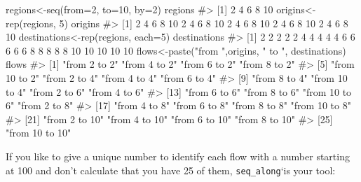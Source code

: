 \documentclass[
  letterpaper,
  DIV=11,
  numbers=noendperiod]{scrreprt}
\newenvironment{Shaded}{\begin{snugshade}}{\end{snugshade}}
\newcommand{\AttributeTok}[1]{\textcolor[rgb]{0.40,0.45,0.13}{#1}}
\newcommand{\CommentTok}[1]{\textcolor[rgb]{0.37,0.37,0.37}{#1}}
\newcommand{\DecValTok}[1]{\textcolor[rgb]{0.68,0.00,0.00}{#1}}
\newcommand{\FunctionTok}[1]{\textcolor[rgb]{0.28,0.35,0.67}{#1}}
\newcommand{\NormalTok}[1]{\textcolor[rgb]{0.00,0.23,0.31}{#1}}
\newcommand{\OtherTok}[1]{\textcolor[rgb]{0.00,0.23,0.31}{#1}}
\newcommand{\StringTok}[1]{\textcolor[rgb]{0.13,0.47,0.30}{#1}}
\begin{document}
\begin{Shaded}
\begin{Highlighting}[]
\NormalTok{regions}\OtherTok{\textless{}{-}}\FunctionTok{seq}\NormalTok{(}\AttributeTok{from=}\DecValTok{2}\NormalTok{, }\AttributeTok{to=}\DecValTok{10}\NormalTok{, }\AttributeTok{by=}\DecValTok{2}\NormalTok{)}
\NormalTok{regions}
\CommentTok{\#\textgreater{} [1]  2  4  6  8 10}
\NormalTok{origins}\OtherTok{\textless{}{-}}\FunctionTok{rep}\NormalTok{(regions, }\DecValTok{5}\NormalTok{)}
\NormalTok{origins}
\CommentTok{\#\textgreater{}  [1]  2  4  6  8 10  2  4  6  8 10  2  4  6  8 10  2  4  6  8 10  2  4  6  8 10}
\NormalTok{destinations}\OtherTok{\textless{}{-}}\FunctionTok{rep}\NormalTok{(regions, }\AttributeTok{each=}\DecValTok{5}\NormalTok{)}
\NormalTok{destinations}
\CommentTok{\#\textgreater{}  [1]  2  2  2  2  2  4  4  4  4  4  6  6  6  6  6  8  8  8  8  8 10 10 10 10 10}
\NormalTok{flows}\OtherTok{\textless{}{-}}\FunctionTok{paste}\NormalTok{(}\StringTok{"from "}\NormalTok{,origins, }\StringTok{" to "}\NormalTok{, destinations)}
\NormalTok{flows}
\CommentTok{\#\textgreater{}  [1] "from  2  to  2"   "from  4  to  2"   "from  6  to  2"   "from  8  to  2"  }
\CommentTok{\#\textgreater{}  [5] "from  10  to  2"  "from  2  to  4"   "from  4  to  4"   "from  6  to  4"  }
\CommentTok{\#\textgreater{}  [9] "from  8  to  4"   "from  10  to  4"  "from  2  to  6"   "from  4  to  6"  }
\CommentTok{\#\textgreater{} [13] "from  6  to  6"   "from  8  to  6"   "from  10  to  6"  "from  2  to  8"  }
\CommentTok{\#\textgreater{} [17] "from  4  to  8"   "from  6  to  8"   "from  8  to  8"   "from  10  to  8" }
\CommentTok{\#\textgreater{} [21] "from  2  to  10"  "from  4  to  10"  "from  6  to  10"  "from  8  to  10" }
\CommentTok{\#\textgreater{} [25] "from  10  to  10"}
\end{Highlighting}
\end{Shaded}

If you like to give a unique number to identify each flow with a number
starting at 100 and don't calculate that you have 25 of them,
\texttt{seq\_along}`is your tool:
\end{document}
